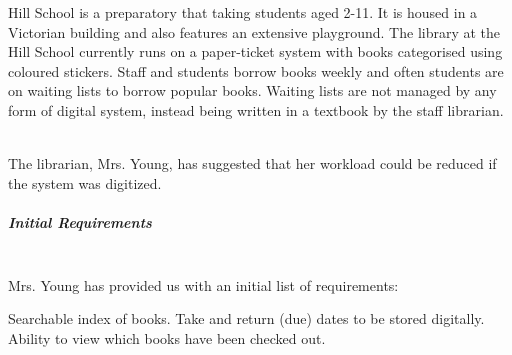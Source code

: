 \documentclass[../../../main.tex]{subfiles}
\begin{document}
\begin{comment}
\end{outline}

An inventory system should be able to:

time consuming to add data
not user friendly

- catalogue of inventory, re-order for you
- scan using a phone (no external hardware needed)
- alert / re-order when stocks are running low.
- purchase links
- stretch: source data from amazon or equivalent instead of typing it manually
- search engine for catalogued and new Parts
- provides with options for where to purchase certain goods
- button to re-order
- smart device???????
- predict when stocks will run out.
- source data from external sources
- like monzo projection of when it will run out
- how much you are spending each month on goods
- nfc support to easily scan / etc items (might be too hard on iOS)
\textbf{Barcode check in / out}
- monzo integration
- budgeting - figure projections  as well
clearly define what the APP will feature.
Think about
- potential users
- how does the app cater to their needs - different features etc


\end{comment}

Hill School is a preparatory that taking students aged 2-11. It is housed in a Victorian building
and also features an extensive playground. The library at the Hill School currently runs on a
paper-ticket system with books categorised using coloured stickers. Staff and students
borrow books weekly and often students are on waiting lists to borrow popular books. Waiting lists
are not managed by any form of digital system, instead being written in a textbook by the staff
librarian.

\noindent \\ The librarian, Mrs. Young, has suggested that her workload could be reduced if the
system was digitized.

\subparagraph{Initial Requirements\\}

\noindent \\ Mrs. Young has provided us with an initial list of requirements:

\begin{outline}
    \1 Searchable index of books.
    \1 Take and return (due) dates to be stored digitally.
    \1 Ability to view which books have been checked out.
\end{outline}
\end{document}

